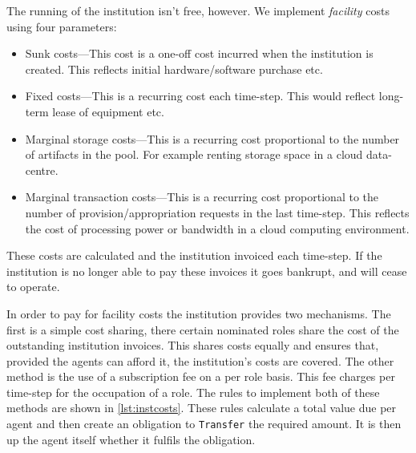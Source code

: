 The running of the institution isn't free, however. We implement
\emph{facility} costs using four parameters:

\begin{itemize}
\item Sunk costs---This cost is a one-off cost incurred when the institution is created. This reflects initial hardware/software purchase etc.
\item Fixed costs---This is a recurring cost each time-step. This would reflect long-term lease of equipment etc.
\item Marginal storage costs---This is a recurring cost proportional to the number of artifacts in the pool. For example renting storage space in a cloud data-centre.
\item Marginal transaction costs---This is a recurring cost proportional to the number of provision/appropriation requests in the last time-step. This reflects the cost of processing power or bandwidth in a cloud computing environment.
\end{itemize}

These costs are calculated and the institution invoiced each time-step. If the
institution is no longer able to pay these invoices it goes bankrupt, and will
cease to operate.


In order to pay for facility costs the institution provides two mechanisms.
The first is a simple cost sharing, there certain nominated roles share the
cost of the outstanding institution invoices. This shares costs equally and
ensures that, provided the agents can afford it, the institution's costs are
covered. The other method is the use of a subscription fee on a per role
basis. This fee charges per time-step for the occupation of a role. The rules
to implement both of these methods are shown in \autoref{lst:instcosts}. These
rules calculate a total value due per agent and then create an obligation to
\texttt{Transfer} the required amount. It is then up the agent itself whether
it fulfils the obligation.

